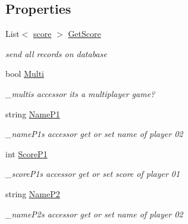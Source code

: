 \subsection*{Properties}
\begin{DoxyCompactItemize}
\item 
List$<$ \hyperlink{class_morpion_1_1score}{score} $>$ \hyperlink{class_morpion_1_1_model_a088eacfea472a460a1b6ec1e85f3bc8a}{Get\+Score}
\begin{DoxyCompactList}\small\item\em send all records on database \end{DoxyCompactList}\item 
bool \hyperlink{class_morpion_1_1_model_a47fdf7d505cd7dd8f43b73bd7ac2feb4}{Multi}
\begin{DoxyCompactList}\small\item\em \+\_\+multi\textquotesingle{}s accessor it\textquotesingle{}s a multiplayer game? \end{DoxyCompactList}\item 
string \hyperlink{class_morpion_1_1_model_a95982016831a025998f12b630550d009}{Name\+P1}
\begin{DoxyCompactList}\small\item\em \+\_\+name\+P1\textquotesingle{}s accessor get or set name of player 02 \end{DoxyCompactList}\item 
int \hyperlink{class_morpion_1_1_model_ac07840451cf10dfa2bff76768425963b}{Score\+P1}
\begin{DoxyCompactList}\small\item\em \+\_\+score\+P1\textquotesingle{}s accessor get or set score of player 01 \end{DoxyCompactList}\item 
string \hyperlink{class_morpion_1_1_model_a54eefe46fd6d10d15f8b34cf2ee943e6}{Name\+P2}
\begin{DoxyCompactList}\small\item\em \+\_\+name\+P2\textquotesingle{}s accessor get or set name of player 02 \end{DoxyCompactList}\item 

\end{DoxyCompactItemize}
